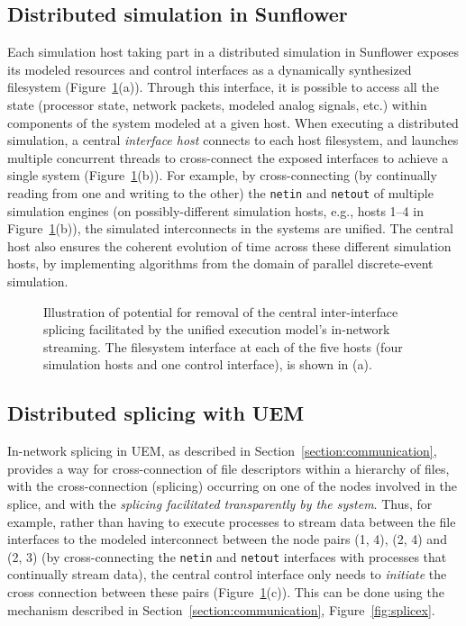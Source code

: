 \documentclass{sig-alternate}
\begin{document}
\subsection{Distributed simulation in Sunflower}
Each simulation host taking part in a distributed simulation in
Sunflower exposes its modeled resources and control interfaces
as a dynamically synthesized filesystem (Figure~\ref{fig:in-network-splicing}(a)).
Through this interface, it is possible to access all the state
(processor state, network packets, modeled analog signals, etc.) within
components of the system modeled at a given host.  When executing
a distributed simulation, a central {\it interface host} connects
to each host filesystem, and launches multiple concurrent threads
to cross-connect the exposed interfaces to achieve a single system
(Figure~\ref{fig:in-network-splicing}(b)). For example, by
cross-connecting (by continually reading from one and writing to the other)
the {\tt netin} and {\tt netout} of multiple
simulation engines (on possibly-different simulation hosts, e.g.,
hosts 1--4 in Figure~\ref{fig:in-network-splicing}(b)), the simulated
interconnects in the systems are unified.  The central host
also ensures the coherent evolution of time across these different
simulation hosts, by implementing algorithms from the
domain of parallel discrete-event simulation.

\begin{figure}
\hspace{0.25in}
\hspace{0.25in}
\vspace{-0.1in}
\caption{Illustration of potential for removal of the central
inter-interface splicing facilitated by the unified execution
model's in-network streaming. The filesystem interface at each
of the five hosts (four simulation hosts and one control interface),
is shown in (a).}
\label{fig:in-network-splicing}
\end{figure}

\subsection{Distributed splicing with UEM}
In-network splicing in UEM, as described in
Section~\ref{section:communication}, provides a way for cross-connection
of file descriptors within a hierarchy of files, with the
cross-connection (splicing) occurring on one of the nodes involved
in the splice, and with the {\it splicing facilitated transparently
by the system}. Thus, for example, rather than having to execute
processes to stream data between the file interfaces to the modeled
interconnect between the node pairs (1, 4), (2, 4) and (2, 3) (by
cross-connecting the {\tt netin} and {\tt netout} interfaces with
processes that continually stream data), the central control interface
only needs to {\it initiate} the cross connection between these
pairs (Figure~\ref{fig:in-network-splicing}(c)). This can be done using the mechanism
described in Section~\ref{section:communication}, Figure~\ref{fig:splicex}.
\end{document}
